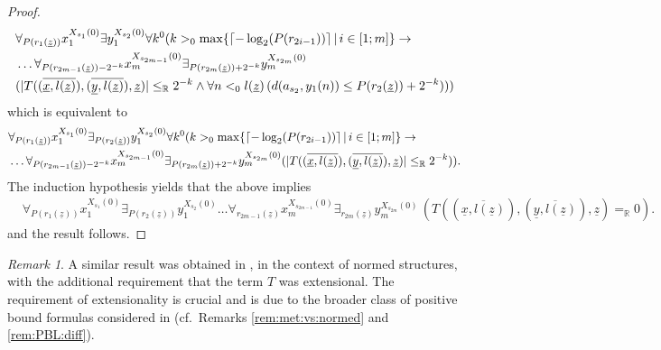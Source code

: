 \documentclass[11pt]{amsart}
\theoremstyle{definition}
\theoremstyle{remark}
\newtheorem{remark}[theorem]{Remark}
\DeclarePairedDelimiter{\ceil}{\lceil}{\rceil}
\def\RR{\mathbb{R}}
\begin{document}
\begin{proof}
\begin{align*}
    &\forall_{P(r_1(\underline{z}))} x_1^{X_{s_1}(0)} \exists y_1^{X_{s_2}(0)}\forall k^0( k>_0\max\{\ceil{-\log_2(P(r_{2i-1}))}\,|\, i \in [1;m]\} \to\\ & \ldots \forall_{P(r_{2m-1}(\underline{z}))-2^{-k}} x_m^{X_{s_{2m-1}}(0)}\exists_{P(r_{2m}(\underline{z}))+2^{-k}} y_m^{X_{s_{2m}}(0)}\\&(|T((\overline{\underline{x},l(\underline{z})}),(\overline{\underline{y},l(\underline{z})}),\underline{z})|\le_\RR 2^{-k}\land  \forall n<_0l(\underline{z})\,( d(a_{s_2},y_1(n))\le P(r_2(\underline{z}))+2^{-k})))
\end{align*}
which is equivalent to 
\begin{align*}
    &\forall_{P(r_1(\underline{z}))} x_1^{X_{s_1}(0)} \exists_{P(r_2(\underline{z}))} y_1^{X_{s_2}(0)}\forall k^0( k>_0\max\{\ceil{-\log_2(P(r_{2i-1}))}\,|\, i \in [1;m]\} \to\\ & \ldots \forall_{P(r_{2m-1}(\underline{z}))-2^{-k}} x_m^{X_{s_{2m-1}}(0)}\exists_{P(r_{2m}(\underline{z}))+2^{-k}} y_m^{X_{s_{2m}}(0)}(|T((\overline{\underline{x},l(\underline{z})}),(\overline{\underline{y},l(\underline{z})}),\underline{z})|\le_\RR 2^{-k})).
\end{align*}
The induction hypothesis yields that the above implies 
\begin{align*}
    &\forall_{P(r_1(\underline{z}))} x_1^{X_{s_1}(0)} \exists_{P(r_2(\underline{z}))} y_1^{X_{s_2}(0)}\ldots \forall_{r_{2m-1}(\underline{z})} x_m^{X_{s_{2m-1}}(0)}\exists_{r_{2m}(\underline{z})} y_m^{X_{s_{2m}}(0)}\,(T((\overline{\underline{x},l(\underline{z})}),(\overline{\underline{y},l(\underline{z})}),\underline{z})=_\RR 0).
\end{align*}
and the result follows.
\end{proof}
\begin{remark}
    A similar result was obtained in \cite[Theorem 6.33]{GuK2016}, in the context of normed structures, with the additional requirement that the term $T$ was extensional. The requirement of extensionality is crucial and is due to the broader class of positive bound formulas considered in \cite{GuK2016} (cf.\ Remarks \ref{rem:met:vs:normed} and \ref{rem:PBL:diff}).
\end{remark}
\end{document}
